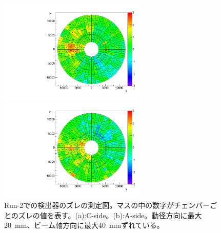 \begin{figure}
    \begin{minipage}[tb]{0.4\linewidth}
        \hspace*{-0.5cm}
        \centering
        \includegraphics[clip, width=7cm]{fig/3/TGCAlign_CW.muon.bias.20160606.v1.C-side.pdf}
        \subcaption{}
    \end{minipage}
    \hfill
    \begin{minipage}[tb]{0.4\linewidth}
        \centering
        \hspace*{-1cm}
        \includegraphics[clip, width=7cm]{fig/3/TGCAlign_CW.muon.bias.20160606.v1.A-side.pdf}
        \subcaption{}
    \end{minipage}
    \caption{Run-2での検出器のズレの測定図。マスの中の数字がチェンバーごとのズレの値を表す。(a):C-side。(b):A-side。動径方向に最大20~mm、ビーム軸方向に最大40~mmずれている\cite{article:yamauti-mron}。}
    \label{fig:ズレ}
\end{figure}


